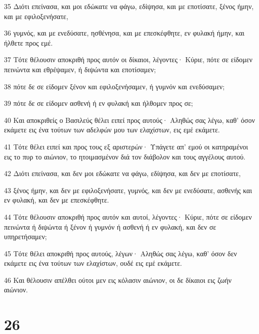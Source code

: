 \par 35 Διότι επείνασα, και μοι εδώκατε να φάγω, εδίψησα, και με εποτίσατε, ξένος ήμην, και με εφιλοξενήσατε,
\par 36 γυμνός, και με ενεδύσατε, ησθένησα, και με επεσκέφθητε, εν φυλακή ήμην, και ήλθετε προς εμέ.
\par 37 Τότε θέλουσιν αποκριθή προς αυτόν οι δίκαιοι, λέγοντες· Κύριε, πότε σε είδομεν πεινώντα και εθρέψαμεν, ή διψώντα και εποτίσαμεν;
\par 38 πότε δε σε είδομεν ξένον και εφιλοξενήσαμεν, ή γυμνόν και ενεδύσαμεν;
\par 39 πότε δε σε είδομεν ασθενή ή εν φυλακή και ήλθομεν προς σε;
\par 40 Και αποκριθείς ο Βασιλεύς θέλει ειπεί προς αυτούς· Αληθώς σας λέγω, καθ' όσον εκάμετε εις ένα τούτων των αδελφών μου των ελαχίστων, εις εμέ εκάμετε.
\par 41 Τότε θέλει ειπεί και προς τους εξ αριστερών· Υπάγετε απ' εμού οι κατηραμένοι εις το πυρ το αιώνιον, το ητοιμασμένον διά τον διάβολον και τους αγγέλους αυτού.
\par 42 Διότι επείνασα, και δεν μοι εδώκατε να φάγω, εδίψησα, και δεν με εποτίσατε,
\par 43 ξένος ήμην, και δεν με εφιλοξενήσατε, γυμνός, και δεν με ενεδύσατε, ασθενής και εν φυλακή, και δεν με επεσκέφθητε.
\par 44 Τότε θέλουσιν αποκριθή προς αυτόν και αυτοί, λέγοντες· Κύριε, πότε σε είδομεν πεινώντα ή διψώντα ή ξένον ή γυμνόν ή ασθενή ή εν φυλακή, και δεν σε υπηρετήσαμεν;
\par 45 Τότε θέλει αποκριθή προς αυτούς, λέγων· Αληθώς σας λέγω, καθ' όσον δεν εκάμετε εις ένα τούτων των ελαχίστων, ουδέ εις εμέ εκάμετε.
\par 46 Και θέλουσιν απέλθει ούτοι μεν εις κόλασιν αιώνιον, οι δε δίκαιοι εις ζωήν αιώνιον.

\chapter{26}

